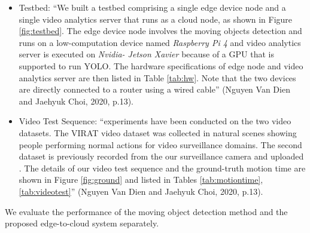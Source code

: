 \begin{itemize}
\item Testbed: “We built a testbed comprising a single edge device node and a single video analytics server that runs as a cloud node, as shown in Figure \ref{fig:testbed}. The edge device node involves the moving objects detection and runs on a low-computation device named \textit{Raspberry Pi 4} and video analytics server is executed on \textit{Nvidia- Jetson Xavier} because of a GPU that is supported to run YOLO. The hardware specifications of edge node and video analytics server are then listed in Table \ref{tab:hw}. Note that the two devices are directly connected to a router using a wired cable” (Nguyen Van Dien and Jaehyuk Choi, 2020, p.13).
\item Video Test Sequence: “experiments have been conducted on the two video datasets. The VIRAT video dataset \cite{VIRAT} was collected in natural scenes showing people performing normal actions for video surveillance domains. The second dataset is previously recorded from the our surveillance camera and uploaded \cite{testvideo}. The details of our video test sequence and the ground-truth motion time are shown in Figure \ref{fig:ground} and listed in Tables \ref{tab:motiontime},\ref{tab:videotest}” (Nguyen Van Dien and Jaehyuk Choi, 2020, p.13). 
\end{itemize}
We evaluate the performance of the moving object detection method and the proposed edge-to-cloud system separately.

